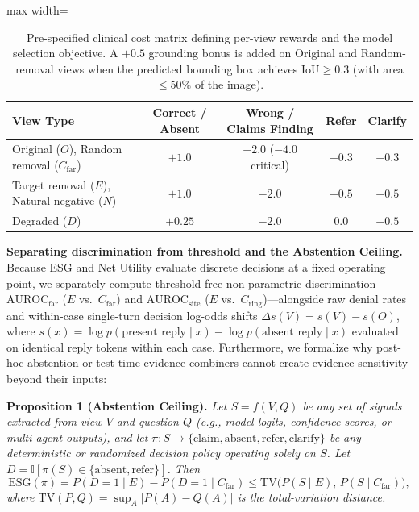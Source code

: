 \documentclass{article} %
\begin{document}
\begin{table}[t]
\caption{Pre-specified clinical cost matrix defining per-view rewards and the model selection objective. A $+0.5$ grounding bonus is added on Original and Random-removal views when the predicted bounding box achieves $\text{IoU} \ge 0.3$ (with area $\le 50\%$ of the image).}
\label{tab:cost_matrix}
\vspace{-0.2cm}
\begin{center}
\small
\begin{adjustbox}{max width=\linewidth}
\begin{tabular}{lcccc}
\toprule
\textbf{View Type} & \textbf{Correct / Absent} & \textbf{Wrong / Claims Finding} & \textbf{Refer} & \textbf{Clarify} \\
\midrule
Original ($O$), Random removal ($C_{\text{far}}$) & $+1.0$ & $-2.0$ ($-4.0$ critical) & $-0.3$ & $-0.3$ \\
Target removal ($E$), Natural negative ($N$) & $+1.0$ & $-2.0$ & $+0.5$ & $-0.5$ \\
Degraded ($D$) & $+0.25$ & $-2.0$ & $0.0$ & $+0.5$ \\
\bottomrule
\end{tabular}
\end{adjustbox}
\end{center}
\vspace{-0.2cm}
\end{table}

\textbf{Separating discrimination from threshold and the Abstention Ceiling.} Because ESG and Net Utility evaluate discrete decisions at a fixed operating point, we separately compute threshold-free non-parametric discrimination---$\text{AUROC}_{\text{far}}$ ($E$ vs.\ $C_{\text{far}}$) and $\text{AUROC}_{\text{site}}$ ($E$ vs.\ $C_{\text{ring}}$)---alongside raw denial rates and within-case single-turn decision log-odds shifts $\Delta s(V) = s(V) - s(O)$, where $s(x) = \log p(\text{present reply} \mid x) - \log p(\text{absent reply} \mid x)$ evaluated on identical reply tokens within each case. Furthermore, we formalize why post-hoc abstention or test-time evidence combiners cannot create evidence sensitivity beyond their inputs:

\textbf{Proposition 1 (Abstention Ceiling).} \emph{Let $S = f(V, Q)$ be any set of signals extracted from view $V$ and question $Q$ (e.g., model logits, confidence scores, or multi-agent outputs), and let $\pi: S \to \{\text{claim}, \text{absent}, \text{refer}, \text{clarify}\}$ be any deterministic or randomized decision policy operating solely on $S$. Let $D = \mathbb{I}[\pi(S) \in \{\text{absent}, \text{refer}\}]$. Then}
\begin{equation}
\label{eq:abstention_ceiling}
\text{ESG}(\pi) = P(D = 1 \mid E) - P(D = 1 \mid C_{\text{far}}) \le \text{TV}\big(P(S \mid E),\, P(S \mid C_{\text{far}})\big),
\end{equation}
\emph{where $\text{TV}(P, Q) = \sup_{A} |P(A) - Q(A)|$ is the total-variation distance.}
\end{document}
